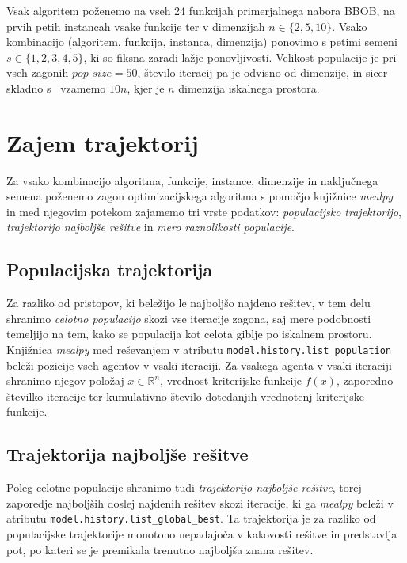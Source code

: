 \documentclass[a4paper, 12pt]{book}
\begin{document}
Vsak algoritem poženemo na vseh 24 funkcijah primerjalnega nabora BBOB, na
prvih petih instancah vsake funkcije ter v dimenzijah $n \in \{2, 5, 10\}$.
Vsako kombinacijo (algoritem, funkcija, instanca, dimenzija) ponovimo s petimi
semeni $s \in \{1,2,3,4,5\}$, ki so fiksna zaradi lažje ponovljivosti.
Velikost populacije je pri vseh zagonih $\mathit{pop\_size} = 50$, število iteracij pa
je odvisno od dimenzije, in sicer skladno s~\cite{clustopt2025} vzamemo $10n$,
kjer je $n$ dimenzija iskalnega prostora.

\section{Zajem trajektorij}
\label{sec:trajektorije}

Za vsako kombinacijo algoritma, funkcije, instance, dimenzije in naključnega
semena poženemo zagon optimizacijskega algoritma s pomočjo knjižnice \emph{meal\-py} in
med njegovim potekom zajamemo tri vrste podatkov: \emph{populacijsko
trajektorijo}, \emph{trajektorijo najboljše rešitve} in \emph{mero
raznolikosti populacije}.

\subsection{Populacijska trajektorija}

Za razliko od pristopov, ki beležijo le najboljšo najdeno rešitev, v tem delu
shranimo \emph{celotno populacijo} skozi vse iteracije zagona, saj mere
podobnosti temeljijo na tem, kako se populacija kot celota giblje po iskalnem
prostoru. Knjižnica \emph{mealpy} med reševanjem v atributu
\texttt{model.history.list\_po\-pu\-la\-tion} beleži pozicije vseh agentov v vsaki
iteraciji. Za vsakega agenta v vsaki iteraciji shranimo njegov položaj
$x \in \mathbb{R}^n$, vrednost kriterijske funkcije $f(x)$, zaporedno številko
iteracije ter kumulativno število dotedanjih vrednotenj kriterijske funkcije.

\subsection{Trajektorija najboljše rešitve}

Poleg celotne populacije shranimo tudi \emph{trajektorijo najboljše rešitve}, 
torej zaporedje najboljših doslej najdenih rešitev skozi
iteracije, ki ga \emph{mealpy} beleži v atributu
\texttt{model.history.list\_global\_best}. Ta trajektorija je za razliko od
populacijske trajektorije monotono nepadajoča v kakovosti rešitve in
predstavlja pot, po kateri se je premikala trenutno najboljša znana rešitev.
\end{document}
